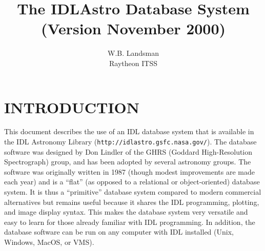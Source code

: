 \topmargin -0.2in
\oddsidemargin-0.15in
\evensidemargin-0.25in
\textheight 8.5in     
\textwidth 6.5in
\newcommand{\de}{$^{\rm o}$ } 
\newcommand{\kms}{km~s$^{-1}$ } 
\newcommand{\exbegin}{\par\medskip}
\newcommand{\exend}{\medskip\noindent}
\newcommand{\exs}[2]{
\hbox to \hsize{\small\hskip .2in
\parbox[t]{2.2in}{\raggedright\setlength{\parindent}{-.2in}\tt #1}
\hspace{.2in}
\parbox[t]{3.4in}{\raggedright\setlength{\parindent}{-.2in}\rm #2}\hss}
\prevdepth=1.5pt\relax}
\newcommand{\exc}[2]{
\hbox to \hsize{\small\hskip .2in
\parbox[t]{3.0in}{\raggedright\setlength{\parindent}{-.2in}\tt #1}
\hspace{.2in}
\parbox[t]{2.6in}{\raggedright\setlength{\parindent}{-.2in}\rm #2}\hss}
\prevdepth=1.5pt\relax}
\newcommand{\exone}[1]{\begin{center}\tt #1 \end{center}}
\newcommand{\ea}{{\em et~al.} {}}
\newcommand{\apjl}{{\em Ap.~J. (Letters)}}

\title{The IDLAstro Database System \\(Version November 2000)}
\author{W.B. Landsman \\ Raytheon ITSS}
\maketitle
\section{INTRODUCTION}

This document describes the use of an IDL database system that is available in
the IDL Astronomy Library ({\tt http://idlastro.gsfc.nasa.gov/}).   The
database software was designed by Don Lindler of the GHRS (Goddard
High-Resolution Spectrograph) group, and  has been adopted by several
astronomy  groups.      The software was originally written in 1987 (though
modest improvements are  made each year) and is a ``flat'' (as opposed to a
relational or object-oriented) database system.   It is thus a ``primitive''
database system compared to modern commercial alternatives but remains useful
because  it shares the IDL programming, plotting, and image display syntax.   
This makes the database system very versatile and easy to learn for those
already familiar with IDL programming.
In addition, the database software can be run on any computer 
with IDL installed (Unix, Windows, MacOS, or VMS).

